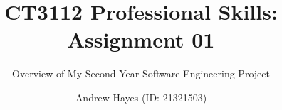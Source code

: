 \documentclass[]{beamer}
\author{Andrew Hayes (ID: 21321503)}
\title{CT3112 Professional Skills: Assignment 01}
\subtitle{Overview of My Second Year Software Engineering Project}
\institute{University of Galway}
\begin{document}
\frame{\titlepage}
\end{document}
